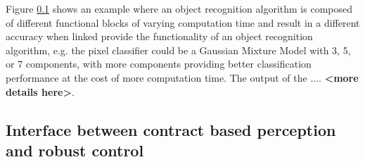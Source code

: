 Figure \ref{} shows an example where an object recognition algorithm is composed of different functional blocks of varying computation time and result in a different accuracy when linked provide the functionality of an object recognition algorithm, e.g. the pixel classifier could be a Gaussian Mixture Model with 3, 5, or 7 components, with more components providing better classification performance at the cost of more computation time. The output of the .... \textbf{<more details here>}. 






\subsection{Interface between contract based perception and robust control}

